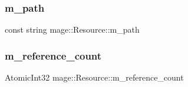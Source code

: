 \hypertarget{classmage_1_1_resource_a983470902250a8d16b6d5d01c332804b}{}\label{classmage_1_1_resource_a983470902250a8d16b6d5d01c332804b} 
\subsubsection{\texorpdfstring{m\+\_\+path}{m\_path}}
{\footnotesize\ttfamily const string mage\+::\+Resource\+::m\+\_\+path\hspace{0.3cm}{\ttfamily [private]}}

\hypertarget{classmage_1_1_resource_a7b54e6436afe7128383ab19172878cd9}{}\label{classmage_1_1_resource_a7b54e6436afe7128383ab19172878cd9} 
\subsubsection{\texorpdfstring{m\+\_\+reference\+\_\+count}{m\_reference\_count}}
{\footnotesize\ttfamily Atomic\+Int32 mage\+::\+Resource\+::m\+\_\+reference\+\_\+count\hspace{0.3cm}{\ttfamily [private]}}

